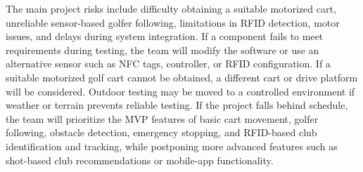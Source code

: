 
The main project risks include difficulty obtaining a suitable motorized cart, unreliable
sensor-based golfer following, limitations in RFID detection, motor issues, and delays
during system integration. If a component fails to meet requirements during testing, the
team will modify the software or use an alternative sensor such as NFC tags, controller, or RFID configuration. If a suitable motorized golf cart cannot be obtained, a different cart or drive platform will be considered. Outdoor testing may be moved to a controlled environment if weather or terrain prevents reliable testing. If the project falls behind schedule, the team will prioritize the MVP features of basic cart movement, golfer following, obstacle detection, emergency stopping, and RFID-based club identification and tracking, while postponing more advanced features such as shot-based club recommendations or mobile-app functionality. 
